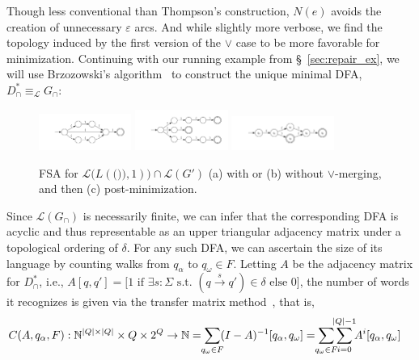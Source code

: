 \documentclass[sigplan,review,acmsmall,nonacm,screen,anonymous]{acmart}\settopmatter{printfolios=false,printccs=false,printacmref=false}
\begin{document}
\noindent Though less conventional than Thompson's construction, $N(e)$ avoids the creation of unnecessary $\varepsilon$ arcs. And while slightly more verbose, we find the topology induced by the first version of the $\lor$ case to be more favorable for minimization. Continuing with our running example from \S~\ref{sec:repair_ex}, we will use Brzozowski's algorithm~\cite{brzozowski1962canonical} to construct the unique minimal DFA, $D^*_\cap \equiv_\mathcal{L} G_\cap$: \vspace{-0.4cm}

\begin{figure}[H]
  \centering
  \includegraphics[width=0.27\textwidth]{figures/dyck_nfa}
  \includegraphics[width=0.27\textwidth]{figures/dyck_nfa_orig}
  \includegraphics[width=0.30\textwidth]{figures/dyck_dfa}
  \vspace{-0.2cm}
  \caption{FSA for $\mathcal{L}\big(L(\texttt{())}, 1)\big)\cap\mathcal{L}(G')$ (a) with or (b) without $\lor$-merging, and then (c) post-minimization.}\label{fig:fsas_for_re}
  \vspace{-0.2cm}
\end{figure}
Since $\mathcal{L}(G_\cap)$ is necessarily finite, we can infer that the corresponding DFA is acyclic and thus representable as an upper triangular adjacency matrix under a topological ordering of $\delta$. For any such DFA, we can ascertain the size of its language by counting walks from $q_\alpha$ to $q_\omega \in F$. Letting $A$ be the adjacency matrix for $D_\cap^*$, i.e., $A[q, q'] = \big[1 \text{ if } \exists s: \Sigma \text{ s.t. } (q \overset{s}{\rightarrow} q') \in \delta \text{ else } 0\big]$, the number of words it recognizes is given via the transfer matrix method~\cite{flajolet2009analytic}, that is,
\begin{align}
  C(A, q_\alpha, F): \mathbb{N}^{|Q|\times|Q|} \times Q \times 2^Q \rightarrow \mathbb{N} = \sum_{\mathclap{q_\omega \in F}}(I-A)^{-1}[q_\alpha, q_\omega] &= \sum_{\mathclap{q_\omega \in F}}\sum_{i = 0}^{\mathclap{|Q|-1}}A^i[q_\alpha, q_\omega]
\end{align}
\end{document}
